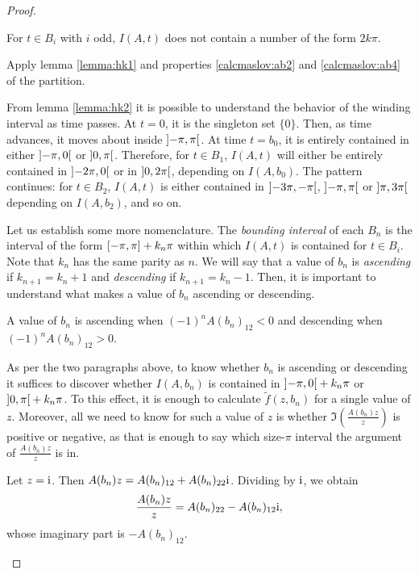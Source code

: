 \begin{proof}
\begin{lemma}
For $t \in B_i$ with $i$ odd, $I(A,t)$ does not contain a number of the form $2k\pi$.
\end{lemma}

\begin{lemmaproof}
Apply lemma \ref{lemma:hk1} and properties \ref{calcmaslov:ab2} and \ref{calcmaslov:ab4} of the partition.
\end{lemmaproof}

From lemma \ref{lemma:hk2} it is possible to understand the behavior of the winding interval as time passes. At $t = 0$, it is the singleton set $\{0\}$. Then, as time advances, it moves about inside $\ointerval{-\pi}\pi$. At time $t = b_0$, it is entirely contained in either $\ointerval{-\pi}0$ or $\ointerval0\pi$. Therefore, for $t \in B_1$, $I(A,t)$ will either be entirely contained in $\ointerval{-2\pi}0$ or in $\ointerval0{2\pi}$, depending on $I(A,b_0)$. The pattern continues: for $t \in B_2$, $I(A,t)$ is either contained in $\ointerval{-3\pi}{-\pi}$, $\ointerval{-\pi}{\pi}$ or $\ointerval{\pi}{3\pi}$ depending on $I(A,b_2)$, and so on.

Let us establish some more nomenclature. The \emph{bounding interval} of each $B_n$ is the interval of the form $\interval{-\pi}\pi + k_n \pi$ within which $I(A,t)$ is contained for $t \in B_i$. Note that $k_n$ has the same parity as $n$. We will say that a value of $b_n$ is \emph{ascending} if $k_{n+1} = k_n + 1$ and \emph{descending} if $k_{n+1} = k_n - 1$. Then, it is important to understand what makes a value of $b_n$ ascending or descending.

\begin{lemma}\label{lemma:hk3}
A value of $b_n$ is ascending when $(-1)^n A(b_n)_{12} < 0$ and descending when $(-1)^n A(b_n)_{12} > 0$.
\end{lemma}

\begin{lemmaproof}
As per the two paragraphs above, to know whether $b_n$ is ascending or descending it suffices to discover whether $I(A,b_n)$ is contained in $\ointerval{-\pi}0 + k_n \pi$ or $\ointerval0\pi + k_n \pi$. To this effect, it is enough to calculate $\tilde f(z,b_n)$ for a single value of $z$. Moreover, all we need to know for such a value of $z$ is whether $\Im\left(\frac{A(b_n) z}z\right)$ is positive or negative, as that is enough to say which size-$\pi$ interval the argument of $\frac{A(b_n) z}z$ is in.

Let $z = \mathrm{i}$. Then $A(b_n)z = A(b_n)_{12} + A(b_n)_{22} \mathrm{i}$. Dividing by $\mathrm{i}$, we obtain
\begin{equation}
\frac{A(b_n)z}z = A(b_n)_{22} - A(b_n)_{12} \mathrm{i},
\end{equation}
whose imaginary part is $-A(b_n)_{12}$.


\end{lemmaproof}
\end{proof}
